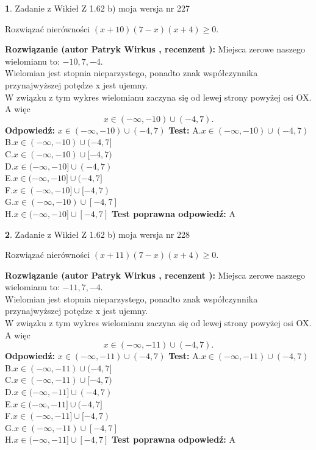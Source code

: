 \documentclass[12pt, a4paper]{article}
\theoremstyle{definition} %
\newtheorem{zad}{}
\newcommand{\zadStart}[1]{\begin{zad}#1\newline}
\newcommand{\zadStop}{\end{zad}}
\newcommand{\rozwStart}[2]{\noindent \textbf{Rozwiązanie (autor #1 , recenzent #2): }\newline}
\newcommand{\rozwStop}{\newline}
\newcommand{\odpStart}{\noindent \textbf{Odpowiedź:}\newline}
\newcommand{\odpStop}{\newline}
\newcommand{\testStart}{\noindent \textbf{Test:}\newline}
\newcommand{\testStop}{\newline}
\newcommand{\kluczStart}{\noindent \textbf{Test poprawna odpowiedź:}\newline}
\newcommand{\kluczStop}{\newline}
\begin{document}
\zadStart{Zadanie z Wikieł Z 1.62 b) moja wersja nr 227}

Rozwiązać nierówności $(x+10)(7-x)(x+4)\ge0$.
\zadStop
\rozwStart{Patryk Wirkus}{}
Miejsca zerowe naszego wielomianu to: $-10, 7, -4$.\\
Wielomian jest stopnia nieparzystego, ponadto znak współczynnika przy\linebreak najwyższej potędze x jest ujemny.\\ W związku z tym wykres wielomianu zaczyna się od lewej strony powyżej osi OX. A więc $$x \in (-\infty,-10) \cup (-4,7).$$
\rozwStop
\odpStart
$x \in (-\infty,-10) \cup (-4,7)$
\odpStop
\testStart
A.$x \in (-\infty,-10) \cup (-4,7)$\\
B.$x \in (-\infty,-10) \cup (-4,7]$\\
C.$x \in (-\infty,-10) \cup [-4,7)$\\
D.$x \in (-\infty,-10] \cup (-4,7)$\\
E.$x \in (-\infty,-10] \cup (-4,7]$\\
F.$x \in (-\infty,-10] \cup [-4,7)$\\
G.$x \in (-\infty,-10) \cup [-4,7]$\\
H.$x \in (-\infty,-10] \cup [-4,7]$
\testStop
\kluczStart
A
\kluczStop



\zadStart{Zadanie z Wikieł Z 1.62 b) moja wersja nr 228}

Rozwiązać nierówności $(x+11)(7-x)(x+4)\ge0$.
\zadStop
\rozwStart{Patryk Wirkus}{}
Miejsca zerowe naszego wielomianu to: $-11, 7, -4$.\\
Wielomian jest stopnia nieparzystego, ponadto znak współczynnika przy\linebreak najwyższej potędze x jest ujemny.\\ W związku z tym wykres wielomianu zaczyna się od lewej strony powyżej osi OX. A więc $$x \in (-\infty,-11) \cup (-4,7).$$
\rozwStop
\odpStart
$x \in (-\infty,-11) \cup (-4,7)$
\odpStop
\testStart
A.$x \in (-\infty,-11) \cup (-4,7)$\\
B.$x \in (-\infty,-11) \cup (-4,7]$\\
C.$x \in (-\infty,-11) \cup [-4,7)$\\
D.$x \in (-\infty,-11] \cup (-4,7)$\\
E.$x \in (-\infty,-11] \cup (-4,7]$\\
F.$x \in (-\infty,-11] \cup [-4,7)$\\
G.$x \in (-\infty,-11) \cup [-4,7]$\\
H.$x \in (-\infty,-11] \cup [-4,7]$
\testStop
\kluczStart
A
\kluczStop
\end{document}
